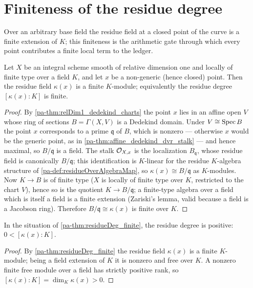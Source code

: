 \section{Finiteness of the residue degree}

Over an arbitrary base field the residue field at a closed point of the curve is a finite extension
of \(K\); this finiteness is the arithmetic gate through which every point contributes a finite
local term to the ledger.

\begin{theorem}
  \label{pa-thm:residueDeg_finite}
  \leanok

  Let \(X\) be an integral scheme smooth of relative dimension one and locally of finite type over a
  field \(K\), and let \(x\) be a non-generic (hence closed) point. Then the residue field
  \(\kappa(x)\) is a finite \(K\)-module; equivalently the residue degree \([\kappa(x):K]\) is
  finite.
\end{theorem}
\begin{proof}
  \leanok
  By \ref{pa-thm:relDim1_dedekind_charts} the point \(x\) lies in an affine open \(V\) whose ring of
  sections \(B = \Gamma(X, V)\) is a Dedekind domain. Under \(V \cong \operatorname{Spec} B\) the point \(x\)
  corresponds to a prime \(\mathfrak q\) of \(B\), which is nonzero --- otherwise \(x\) would be the
  generic point, as in \ref{pa-thm:affine_dedekind_dvr_stalk} --- and hence maximal, so \(B/\mathfrak q\)
  is a field. The stalk \(\mathcal{O}_{X,x}\) is the localization \(B_{\mathfrak q}\), whose residue
  field is canonically \(B/\mathfrak q\); this identification is \(K\)-linear for the residue
  \(K\)-algebra structure of \ref{pa-def:residueOverAlgebraMap}, so \(\kappa(x) \cong B/\mathfrak q\)
  as \(K\)-modules. Now \(K \to B\) is of finite type (\(X\) is locally of finite type over \(K\),
  restricted to the chart \(V\)), hence so is the quotient \(K \to B/\mathfrak q\); a finite-type
  algebra over a field which is itself a field is a finite extension (Zariski's lemma, valid because
  a field is a Jacobson ring). Therefore \(B/\mathfrak q \cong \kappa(x)\) is finite over \(K\).
\end{proof}

\begin{theorem}
  \label{pa-thm:residueDeg_pos}
  \leanok

  In the situation of \ref{pa-thm:residueDeg_finite}, the residue degree is positive:
  \(0 < [\kappa(x):K]\).
\end{theorem}
\begin{proof}
  \leanok
  By \ref{pa-thm:residueDeg_finite} the residue field \(\kappa(x)\) is a finite \(K\)-module; being a
  field extension of \(K\) it is nonzero and free over \(K\). A nonzero finite free module over a
  field has strictly positive rank, so \([\kappa(x):K] = \dim_K \kappa(x) > 0\).
\end{proof}

